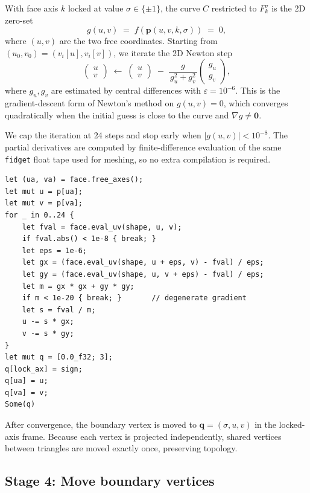\documentclass[11pt]{article}
\begin{document}
With face axis $k$ locked at value $\sigma \in \{\pm 1\}$, the curve $C$
restricted to $F_k^\sigma$ is the 2D zero-set
\[
  g(u, v) \;=\; f(\mathbf{p}(u, v, k, \sigma)) \;=\; 0,
\]
where $(u, v)$ are the two free coordinates.  Starting from
$(u_0, v_0) = (v_i[u], v_i[v])$, we iterate the 2D Newton step
\begin{equation} \label{eq:newton2d}
  \begin{pmatrix} u \\ v \end{pmatrix}
  \;\longleftarrow\;
  \begin{pmatrix} u \\ v \end{pmatrix}
  \;-\; \frac{g}{\,g_u^2 + g_v^2\,}
  \begin{pmatrix} g_u \\ g_v \end{pmatrix},
\end{equation}
where $g_u, g_v$ are estimated by central differences with
$\varepsilon = 10^{-6}$.  This is the gradient-descent form of Newton's
method on $g(u,v) = 0$, which converges quadratically when the initial
guess is close to the curve and $\nabla g \neq \mathbf{0}$.

We cap the iteration at 24 steps and stop early when
$|g(u,v)| < 10^{-8}$.  The partial derivatives are computed by
finite-difference evaluation of the same \texttt{fidget} float tape used
for meshing, so no extra compilation is required.

\begin{lstlisting}
let (ua, va) = face.free_axes();
let mut u = p[ua];
let mut v = p[va];
for _ in 0..24 {
    let fval = face.eval_uv(shape, u, v);
    if fval.abs() < 1e-8 { break; }
    let eps = 1e-6;
    let gx = (face.eval_uv(shape, u + eps, v) - fval) / eps;
    let gy = (face.eval_uv(shape, u, v + eps) - fval) / eps;
    let m = gx * gx + gy * gy;
    if m < 1e-20 { break; }       // degenerate gradient
    let s = fval / m;
    u -= s * gx;
    v -= s * gy;
}
let mut q = [0.0_f32; 3];
q[lock_ax] = sign;
q[ua] = u;
q[va] = v;
Some(q)
\end{lstlisting}

After convergence, the boundary vertex is moved to
$\mathbf{q} = (\sigma, u, v)$ in the locked-axis frame.  Because each
vertex is projected independently, shared vertices between triangles are
moved exactly once, preserving topology.

\subsection{Stage 4: Move boundary vertices}
\end{document}

